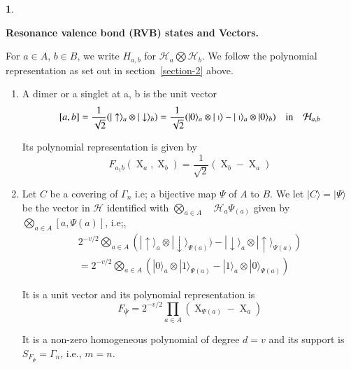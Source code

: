 \documentclass[a4paper,12pt]{article}
\DeclareMathOperator{\x}{\mathrm{X}}
\theoremstyle{definition}
\theoremstyle{underlinethm}
\theoremstyle{definition}
\newtheorem{subsubsec}{}[subsection]
\begin{document}
\begin{subsubsec}\label{subsubsection-3.1.2}

{\bfseries Resonance valence bond (RVB) states and Vectors.}

For $a\in A$, $b \in B$, we write $H_{a,b}$ for $\mathcal{H}_{a} \bigotimes \mathcal{H}_{b}$. We follow the polynomial representation as set out in section~\ref{section-2} above.

\begin{enumerate}[label=(\alph*)]
\item A dimer or a singlet at a, b is the unit vector
$$
[a, b] = \frac{1}{\sqrt{2}} (| \uparrow \rangle_{a} \otimes | \downarrow \rangle_{b}) = \frac{1}{\sqrt{2}}(| 0\rangle_{a} \otimes | \shortmid \rangle - | \shortmid \rangle_{a} \otimes | 0 \rangle_{b})\quad {\rm in} \quad  \mathcal{H}_{a,b} 
$$

Its polynomial representation is given by
\begin{equation*}
F_{a_{1}b}(\x_{a}, \x_{b}) = \frac{1}{\sqrt{2}}(\x_{b}- \x_{a})\tag{3.3}
\end{equation*}

\item Let  $C$ be a covering of $\Gamma_{n}$ i.e; a bijective map $\Psi$ of $A$ to $B$. We let $| C \rangle = | \Psi \rangle$ be the vector in $\mathcal{H}$ identified with $\bigotimes\limits_{a \in A} \quad \mathcal{H}_{a}\Psi_{(a)}$ given by $\bigotimes\limits_{a \in A} [a, \Psi(a)]$, i.e;,
\begin{gather*}
2^{-v/2} \bigotimes\limits_{a \in A} \left(| \uparrow \rangle_{a} \otimes | \downarrow \rangle_{\Psi (a)}) - | \downarrow \rangle_{a} \otimes | \uparrow \rangle_{\Psi (a)}\right)\\
= 2^{-v/2} \bigotimes\limits_{a\in A} \left(|0\rangle_{a} \otimes | 1 \rangle_{\Psi(a)} - |1 \rangle_{a} \otimes | 0 \rangle_{\Psi(a)}\right)
\end{gather*}
 
 
It is a unit vector and its polynomial representation is 
\begin{equation}
F_{\underline{\overline{\Psi}}} = 2^{-v/2} \prod\limits_{a\in A}(\x_{\Psi(a)}- \x_{a})\tag{3.4}\label{eq-3.4}
\end{equation}

It is a non-zero homogeneous polynomial of degree $d=v$ and its support is $S_{F_{\underline{\overline{\Psi}}}} = \Gamma_{n}$, i.e., $m=n$.


\end{enumerate}
\end{subsubsec}
\end{document}
